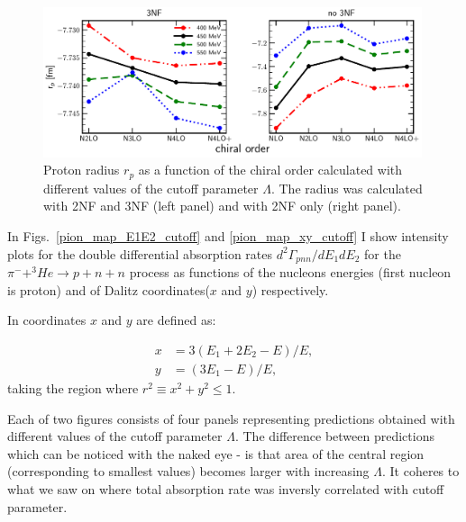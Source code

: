     \begin{figure}[h]
        \begin{center}
        \includegraphics[width=0.99\textwidth]{PlotData/PION/Dalitz_maps/figures/proton_radius_mt31_3NF.pdf}
        \end{center}
        \caption{ Proton radius $r_p$ as a function of the chiral order calculated with
        different values of the cutoff parameter $\Lambda$. The radius was calculated with 2NF and 3NF (left panel)
        and with 2NF only (right panel).}
        \label{proton_rad}
    \end{figure}

    In Figs.~\ref{pion_map_E1E2_cutoff} and \ref{pion_map_xy_cutoff} I show 
    intensity plots for the double differential absorption rates
    $d^2 \Gamma_{pnn}/dE_1dE_2$ for the $\pi^- + ^3He \rightarrow p + n + n$
    process as functions of the nucleons energies (first nucleon is proton) and 
    of  Dalitz coordinates($x$ and $y$) respectively.

    In  coordinates $x$ and $y$ are defined as:

    \begin{align}
        x &= 3 (E_1 + 2E_2 - E)/E, \nonumber\\
        y &= (3E_1 - E)/E,
        \label{dalitz_xy}
    \end{align}
    taking the region where $r^2 \equiv x^2 + y^2 \leq 1$.

    Each of two figures consists of four panels representing predictions obtained with different 
    values of the cutoff parameter $\Lambda$. The difference between predictions which can be 
    noticed with the naked eye - is that area of the central region (corresponding to smallest values)
    becomes larger with increasing $\Lambda$. It coheres to what we saw on 
    where total absorption rate was inversly correlated with cutoff parameter. 
    
